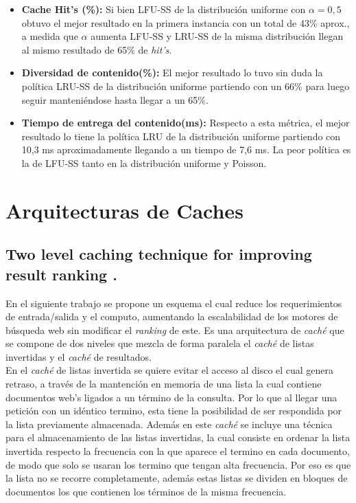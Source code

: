 \documentclass[12pt]{ociamthesis}  %
\begin{document}
\begin{itemize}
	\item \textbf{Cache Hit's (\%):} 
	Si bien LFU-SS de la distribución uniforme con $\alpha = 0,5$ obtuvo el mejor resultado en la primera instancia con un total de 43\% aprox., a medida que $\alpha$ aumenta LFU-SS y LRU-SS de la misma distribución llegan al mismo resultado de 65\% de \textit{hit's}.
	\item \textbf{Diversidad de contenido(\%):}
	El mejor resultado lo tuvo sin duda la política LRU-SS de la distribución uniforme partiendo con un 66\% para luego seguir manteniéndose hasta llegar a un 65\%.
	\item \textbf{Tiempo de entrega del contenido(ms):}
	Respecto a esta métrica, el mejor resultado lo tiene la política LRU de la distribución uniforme partiendo con 10,3 ms aproximadamente llegando a un tiempo de 7,6 ms. La peor política es la de LFU-SS tanto en la distribución uniforme y Poisson.
\end{itemize}

\section{Arquitecturas de Caches}

\subsection{Two level caching technique for improving result ranking \cite{singh2011two}.}

En el siguiente trabajo \cite{singh2011two} se propone un esquema el cual reduce los requerimientos de entrada/salida y el computo, aumentando la escalabilidad de los motores de búsqueda web sin modificar el \textit{ranking} de este. Es una arquitectura de \textit{caché} que se compone de dos niveles que mezcla de forma paralela el \textit{caché} de listas invertidas y el \textit{caché} de resultados.\\

En el \textit{caché} de listas invertida se quiere evitar el acceso al disco el cual genera retraso, a través de la mantención en memoria de una lista la cual contiene documentos web's ligados a un término de la consulta. Por lo que al llegar una petición con un idéntico termino, esta tiene la posibilidad de ser respondida por la lista previamente almacenada. Además en este \textit{caché} se incluye una técnica para el almacenamiento de las listas invertidas, la cual consiste en ordenar la lista invertida respecto la  frecuencia con la que aparece el termino en cada documento, de modo que solo se usaran los termino que tengan alta frecuencia. Por eso es que la lista no se recorre completamente, además estas listas se dividen en bloques de documentos los que contienen los términos de la misma frecuencia.\\
\end{document}
